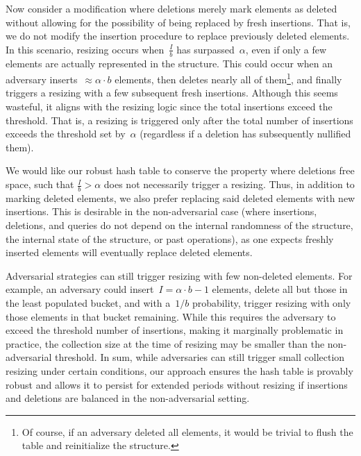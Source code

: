 Now consider a modification where deletions merely mark elements as deleted without allowing for the possibility of being replaced by fresh insertions. That is, we do not modify the insertion procedure to replace previously deleted elements. In this scenario, resizing occurs when~$\frac{I}{b}$ has surpassed~$\alpha$, even if only a few elements are actually represented in the structure. This could occur when an adversary inserts~$\approx \alpha \cdot b$ elements, then deletes nearly all of them\footnote{Of course, if an adversary deleted all elements, it would be trivial to flush the table and reinitialize the structure.}, and finally triggers a resizing with a few subsequent fresh insertions. Although this seems wasteful, it aligns with the resizing logic since the total insertions exceed the threshold. That is, a resizing is triggered only after the total number of insertions exceeds the threshold set by~$\alpha$ (regardless if a deletion has subsequently nullified them).

We would like our robust hash table to conserve the property where deletions free space, such that $\frac{I}{b} > \alpha$ does not necessarily trigger a resizing. Thus, in addition to marking deleted elements, we also prefer replacing said deleted elements with new insertions. This is desirable in the non-adversarial case (where insertions, deletions, and queries do not depend on the internal randomness of the structure, the internal state of the structure, or past operations), as one expects freshly inserted elements will eventually replace deleted elements.

Adversarial strategies can still trigger resizing with few non-deleted elements. For example, an adversary could insert~$I = \alpha \cdot b - 1$ elements, delete all but those in the least populated bucket, and with a~$1/b$ probability, trigger resizing with only those elements in that bucket remaining. While this requires the adversary to exceed the threshold number of insertions, making it marginally problematic in practice, the collection size at the time of resizing may be smaller than the non-adversarial threshold. In sum, while adversaries can still trigger small collection resizing under certain conditions, our approach ensures the hash table is provably robust and allows it to persist for extended periods without resizing if insertions and deletions are balanced in the non-adversarial setting.
